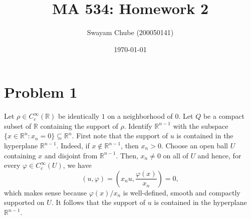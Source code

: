 \documentclass[10pt]{amsart}
\title{MA 534: Homework 2}
\author{Swayam Chube (200050141)}
\date{\today}
\theoremstyle{thmstyle}
\newtheorem*{claim}{Claim}
\theoremstyle{defstyle}
\newcommand{\R}{\mathbb{R}}
\begin{document}
\maketitle 

\section{Problem 1}

Let $\rho\in C_c^\infty(\R)$ be identically $1$ on a neighborhood of $0$. Let $Q$ be a compact subset of $\R$ containing the support of $\rho$. Identify $\R^{n - 1}$ with the subspace $\{x\in\R^n\colon x_n = 0\}\subseteq\R^n$. First note that the support of $u$ is contained in the hyperplane $\R^{n - 1}$. Indeed, if $x\notin\R^{n - 1}$, then $x_n > 0$. Choose an open ball $U$ containing $x$ and disjoint from $\R^{n - 1}$. Then, $x_n\ne 0$ on all of $U$ and hence, for every $\varphi\in C_c^\infty(U)$, we have 
\begin{equation*}
    (u, \varphi) = \left(x_n u, \frac{\varphi(x)}{x_n}\right) = 0,
\end{equation*}
which makes sense because $\varphi(x)/x_n$ is well-defined, smooth and compactly supported on $U$. It follows that the support of $u$ is contained in the hyperplane $\R^{n - 1}$.

\end{document}
